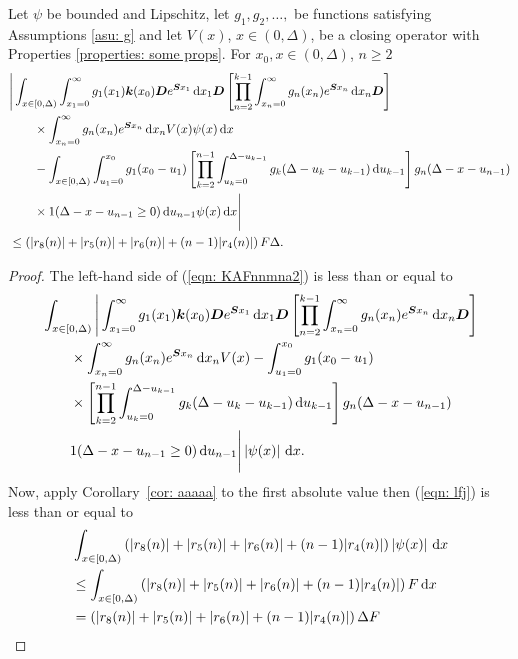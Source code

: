 \begin{cor}
	Let \(\psi\) be bounded and Lipschitz, let \(g_1,g_2,\dots,\) be functions satisfying Assumptions \ref{asu: g} and let \(V(x)\), \(x\in(0,\Delta)\), be a closing operator with Properties \ref{properties: some props}. For \(x_0,x\in(0,\Delta)\), \(n\geq 2\)
	\begin{align}
		&\Bigg| \int_{x\in[0,\Delta)} \int_{x_1=0}^\infty g_1(x_1) \boldsymbol k(x_0) \boldsymbol D e^{\boldsymbol{S}x_1}\, \mathrm{d} x_1\boldsymbol D 
            	\left[\prod_{n=2}^{k-1}\int_{x_n=0}^\infty g_n(x_n) e^{\boldsymbol{S}x_n} \, \mathrm{d} x_n
		\boldsymbol D\right] \nonumber 
            	\\&\qquad{}\times\int_{x_n=0}^\infty g_{n}(x_n) e^{\boldsymbol{S}x_n} \, \mathrm{d} x_n V(x) \psi(x)\, \mathrm{d} x \nonumber 
		\\&\qquad {}- \int_{x\in[0,\Delta)} \int_{u_1=0}^{x_0}g_1(x_0 - u_1)
		\left[\prod_{k=2}^{n-1} \int_{u_k=0}^{\Delta-u_{k-1}} g_k(\Delta-u_k-u_{k-1})\, \mathrm{d} u_{k-1}\right] \nonumber 
            	g_{n}(\Delta - x-u_{n-1})
	\\&\qquad{} \times1(\Delta-x-u_{n-1}\geq0)\, \mathrm{d} u_{n-1}\psi(x)\, \mathrm{d} x \Bigg| \nonumber
		\\&\leq \left(|r_8(n)|+|r_5(n)|+|r_6(n)| + (n-1)|r_4(n)|\right)F\Delta.\label{eqn: KAFnnmna2}
	\end{align}
\end{cor}
\begin{proof}
	The left-hand side of (\ref{eqn: KAFnnmna2}) is less than or equal to 
	\begin{align}
		& \int_{x\in[0,\Delta)} \Bigg| \int_{x_1=0}^\infty g_1(x_1) \boldsymbol k(x_0) \boldsymbol D e^{\boldsymbol{S}x_1}\, \mathrm{d} x_1\boldsymbol D 
            	\left[\prod_{n=2}^{k-1}\int_{x_n=0}^\infty g_n(x_n) e^{\boldsymbol{S}x_n} \, \mathrm{d} x_n
		\boldsymbol D\right] \nonumber 
            	\\&\qquad {}\times\int_{x_n=0}^\infty g_{n}(x_n) e^{\boldsymbol{S}x_n} \, \mathrm{d} x_n V(x)  \nonumber 
		- \int_{u_1=0}^{x_0}g_1(x_0 - u_1)
		\\&\qquad {}\times \left[\prod_{k=2}^{n-1} \int_{u_k=0}^{\Delta-u_{k-1}} g_k(\Delta-u_k-u_{k-1})\, \mathrm{d} u_{k-1}\right] \nonumber 
            	g_{n}(\Delta - x-u_{n-1})
	\\&\qquad{} 1(\Delta-x-u_{n-1}\geq0)\, \mathrm{d} u_{n-1}\Bigg| \left|\psi(x)\right|\, \mathrm{d} x . \label{eqn: lfj}
	\end{align}
	Now, apply Corollary~\ref{cor: aaaaa} to the first absolute value then (\ref{eqn: lfj}) is less than or equal to 
	\begin{align}
		&\int_{x\in[0,\Delta)} \left(|r_8(n)|+|r_5(n)|+|r_6(n)| + (n-1)|r_4(n)|\right) \left|\psi(x)\right|\, \mathrm{d} x  \nonumber 
		\\&\leq \int_{x\in[0,\Delta)} \left(|r_8(n)|+|r_5(n)|+|r_6(n)| + (n-1)|r_4(n)|\right) F\, \mathrm{d} x  \nonumber 
		\\&=  \left(|r_8(n)|+|r_5(n)|+|r_6(n)| + (n-1)|r_4(n)|\right) \Delta F
	\end{align}
\end{proof}

